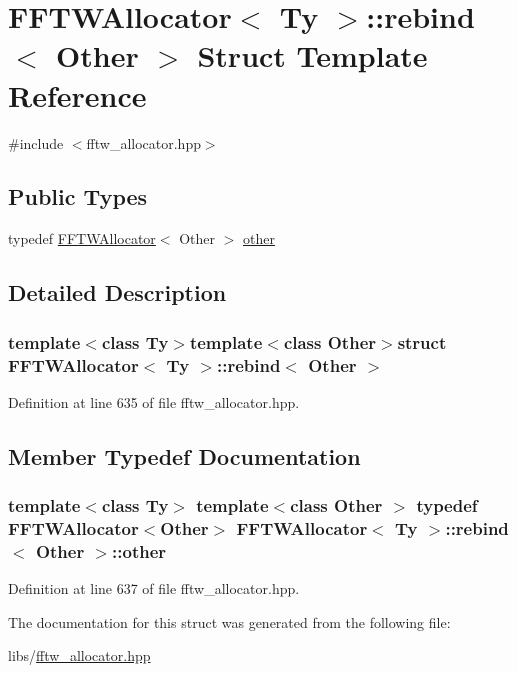 \hypertarget{struct_f_f_t_w_allocator_1_1rebind}{\section{F\-F\-T\-W\-Allocator$<$ Ty $>$\-:\-:rebind$<$ Other $>$ Struct Template Reference}
\label{struct_f_f_t_w_allocator_1_1rebind}
}


{\ttfamily \#include $<$fftw\-\_\-allocator.\-hpp$>$}

\subsection*{Public Types}
\begin{DoxyCompactItemize}
\item 
typedef \hyperlink{class_f_f_t_w_allocator}{F\-F\-T\-W\-Allocator}$<$ Other $>$ \hyperlink{struct_f_f_t_w_allocator_1_1rebind_afb95c67928bb1b2080862e55391076d7}{other}
\end{DoxyCompactItemize}


\subsection{Detailed Description}
\subsubsection*{template$<$class Ty$>$template$<$class Other$>$struct F\-F\-T\-W\-Allocator$<$ Ty $>$\-::rebind$<$ Other $>$}



Definition at line 635 of file fftw\-\_\-allocator.\-hpp.



\subsection{Member Typedef Documentation}
\hypertarget{struct_f_f_t_w_allocator_1_1rebind_afb95c67928bb1b2080862e55391076d7}{
\subsubsection[{other}]{\setlength{\rightskip}{0pt plus 5cm}template$<$class Ty$>$ template$<$class Other $>$ typedef {\bf F\-F\-T\-W\-Allocator}$<$Other$>$ {\bf F\-F\-T\-W\-Allocator}$<$ Ty $>$\-::{\bf rebind}$<$ Other $>$\-::{\bf other}}}\label{struct_f_f_t_w_allocator_1_1rebind_afb95c67928bb1b2080862e55391076d7}


Definition at line 637 of file fftw\-\_\-allocator.\-hpp.



The documentation for this struct was generated from the following file\-:\begin{DoxyCompactItemize}
\item 
libs/\hyperlink{fftw__allocator_8hpp}{fftw\-\_\-allocator.\-hpp}\end{DoxyCompactItemize}
